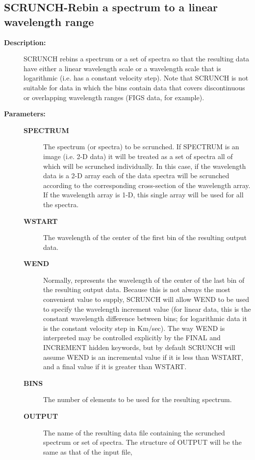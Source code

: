 \subsection{SCRUNCH-\label{SCRUNCH}Rebin a spectrum to a linear wavelength range}
\begin{description}

\item [\textbf{Description:}]
 SCRUNCH rebins a spectrum or a set of spectra so that the resulting
 data have either a linear wavelength scale or a wavelength scale
 that is logarithmic (i.e. has a constant velocity step).  Note that
 SCRUNCH is not suitable for data in which the bins contain data that
 covers discontinuous or overlapping wavelength ranges (FIGS data,
 for example).

\item [\textbf{Parameters:}]
\begin{description}
\item [\textbf{SPECTRUM}]
 The spectrum (or spectra) to be scrunched.
 If SPECTRUM is an image (i.e. 2-D data) it will be treated
 as a set of spectra all of which will be scrunched
 individually.  In this case, if the wavelength data is
 a 2-D array each of the data spectra will be scrunched
 according to the corresponding cross-section of the
 wavelength array.  If the wavelength array is 1-D, this
 single array will be used for all the spectra.
\item [\textbf{WSTART}]
 The wavelength of the center of the first bin
 of the resulting output data.
\item [\textbf{WEND}]
 Normally, represents the wavelength of the center of
 the last bin of the resulting output data.  Because this
 is not always the most convenient value to supply, SCRUNCH
 will allow WEND to be used to specify the wavelength
 increment value (for linear data, this is the constant
 wavelength difference between bins; for logarithmic data
 it is the constant velocity step in Km/sec).  The way
 WEND is interpreted may be controlled explicitly by the
 FINAL and INCREMENT hidden keywords, but by default SCRUNCH
 will assume WEND is an incremental value if it is less than
 WSTART, and a final value if it is greater than WSTART.
\item [\textbf{BINS}]
 The number of elements to be used for the resulting spectrum.
\item [\textbf{OUTPUT}]
 The name of the resulting data file containing
 the scrunched spectrum or set of spectra.  The structure
 of OUTPUT will be the same as that of the input file,

\end{description}
\end{description}
